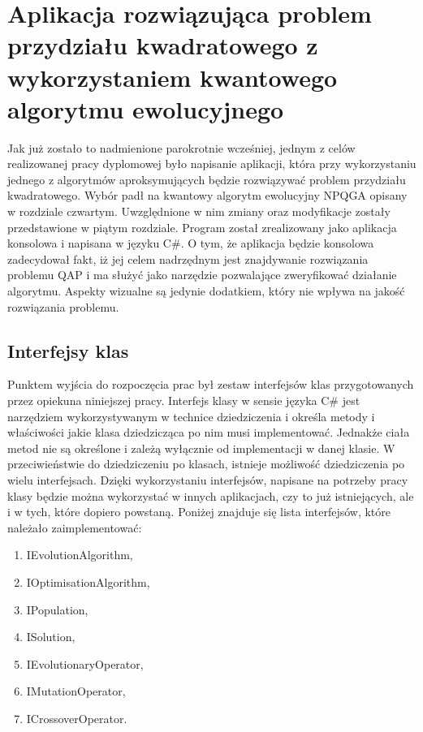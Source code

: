 \chapter{Aplikacja rozwiązująca problem przydziału kwadratowego z wykorzystaniem kwantowego algorytmu ewolucyjnego}
\label{cha:aplikacja}
Jak już zostało to nadmienione parokrotnie wcześniej, jednym z celów realizowanej pracy dyplomowej było napisanie aplikacji, która przy wykorzystaniu jednego z algorytmów aproksymujących będzie rozwiązywać problem przydziału kwadratowego. Wybór padł na kwantowy algorytm ewolucyjny NPQGA opisany w rozdziale czwartym. Uwzględnione w nim zmiany oraz modyfikacje zostały przedstawione w piątym rozdziale. Program został zrealizowany jako aplikacja konsolowa i napisana w języku C\#. O tym, że aplikacja będzie konsolowa zadecydował fakt, iż jej celem nadrzędnym jest znajdywanie rozwiązania problemu QAP i ma służyć jako narzędzie pozwalające zweryfikować działanie algorytmu. Aspekty wizualne są jedynie dodatkiem, który nie wpływa na jakość rozwiązania problemu.

\section{Interfejsy klas}
Punktem wyjścia do rozpoczęcia prac był zestaw interfejsów klas przygotowanych przez opiekuna niniejszej pracy. Interfejs klasy w sensie języka C\# jest narzędziem wykorzystywanym w technice dziedziczenia i określa metody i właściwości jakie klasa dziedzicząca po nim musi implementować. Jednakże ciała metod nie są określone i zależą wyłącznie od implementacji w danej klasie. W przeciwieństwie do dziedziczeniu po klasach, istnieje możliwość dziedziczenia po wielu interfejsach. Dzięki wykorzystaniu interfejsów, napisane na potrzeby pracy klasy będzie można wykorzystać w innych aplikacjach, czy to już istniejących, ale i w tych, które dopiero powstaną. Poniżej znajduje się lista interfejsów, które należało zaimplementować:
\begin{enumerate}
\item IEvolutionAlgorithm,
\item IOptimisationAlgorithm,
\item IPopulation,
\item ISolution,
\item IEvolutionaryOperator,
\item IMutationOperator,
\item ICrossoverOperator.
\end{enumerate}

